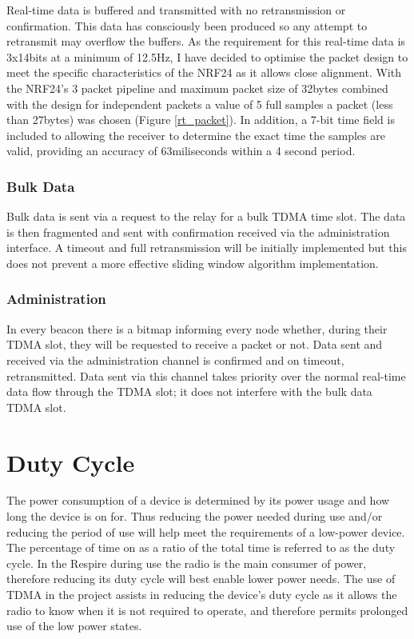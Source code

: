 Real-time data is buffered and transmitted with no retransmission or confirmation. This data has
consciously been produced so any attempt to retransmit may overflow the buffers.
As the requirement for this real-time data is 3x14bits at a minimum of 12.5Hz, I
have decided to optimise the packet design to meet the specific characteristics of
the \ac{NRF24} as it allows close alignment. With the \ac{NRF24}'s 3 packet pipeline
and maximum packet size of 32bytes combined with the design for independent packets
a value of 5 full samples a packet (less than 27bytes) was chosen (Figure \ref{rt_packet}). In addition,
a 7-bit time field is included to allowing the receiver to determine the exact time
the samples are valid, providing an accuracy of 63miliseconds within a 4 second period.


\subsubsection{Bulk Data}
Bulk data is sent via a request to the relay for a bulk \ac{TDMA} time slot. The data is then fragmented
and sent with confirmation received via the administration interface. A timeout and full
retransmission will be initially implemented but this does not prevent a more effective sliding
window algorithm implementation.

\subsubsection{Administration}
In every beacon there is a bitmap informing every node whether, during their \ac{TDMA} slot, they will
be requested to receive a packet or not. Data sent and received via the administration channel is
confirmed and on timeout, retransmitted. Data sent via this channel takes priority over the normal
real-time data flow through the \ac{TDMA} slot; it does not interfere with the bulk data \ac{TDMA} slot.


\section{Duty Cycle}
The power consumption of a device is determined by its power usage and how long the device is on
for. Thus reducing the power needed during use and/or reducing the period of use will help meet
the requirements of a low-power device. The percentage of time on as a ratio of the total time is
referred to as the duty cycle. In the Respire during use the radio is the main consumer of power,
therefore reducing its duty cycle will best enable lower power needs. The use of \ac{TDMA} in the project
assists in reducing the device's duty cycle as it allows the radio to know when it is not required to
operate, and therefore permits prolonged use of the low power states.


